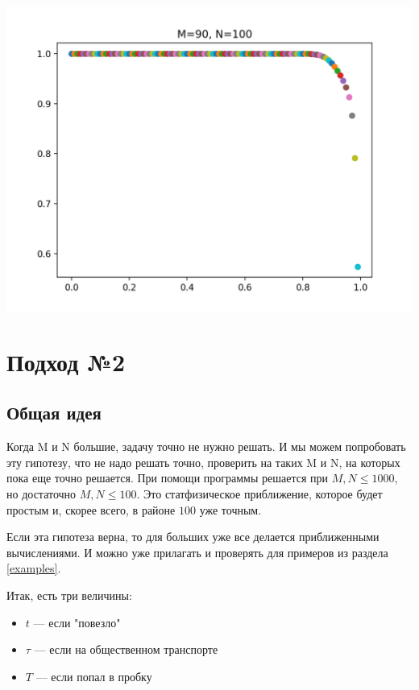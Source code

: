 \includegraphics[scale=0.5]{img/100_90}



\section{Подход №2}


\subsection{Общая идея}

Когда M и N большие, задачу точно не нужно решать. И мы можем попробовать эту гипотезу, что не надо решать точно, проверить на таких M и N, на которых пока еще точно решается. При помощи программы решается при $M,N \le 1000$, но достаточно $M,N \le 100$. Это статфизическое приближение, которое будет простым и, скорее всего, в районе $100$ уже точным.

Если эта гипотеза верна, то для больших уже все делается приближенными вычислениями. И можно уже прилагать и проверять для примеров из раздела \ref{examples}.

Итак, есть три величины: 
\begin{itemize}
	\item $t$ --- если "повезло"
	\item $\tau$ --- если на общественном транспорте
	\item $T$ --- если попал в пробку
\end{itemize}

